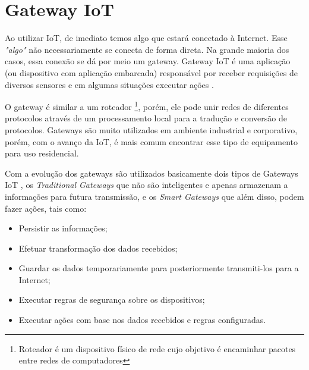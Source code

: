 \section{Gateway IoT}
\label{sec:iotGateway}

Ao utilizar IoT, de imediato temos algo que estará conectado à Internet. Esse \textit{"algo"} não necessariamente se conecta de forma direta. Na grande maioria dos casos, essa conexão se dá por meio um gateway. Gateway IoT é uma aplicação (ou dispositivo com aplicação embarcada) responsável por receber requisições de diversos sensores e em algumas situações executar ações \cite{ChenJiaLi}. 

O gateway é similar a um roteador \footnote{Roteador é um dispositivo físico de rede cujo objetivo é encaminhar pacotes entre redes de computadores}, porém, ele pode unir redes de diferentes protocolos através de um processamento local para a tradução e conversão de protocolos. Gateways são muito utilizados em ambiente industrial e corporativo, porém, com o avanço da IoT, é mais comum encontrar esse tipo de equipamento para uso residencial.

Com a evolução dos gateways são utilizados basicamente dois tipos de Gateways IoT \cite{WhatIsIotGateway}, os \textit{Traditional Gateways} que não são inteligentes e apenas armazenam a informações para futura transmissão, e os \textit{Smart Gateways} que além disso, podem fazer ações, tais como:
\begin{itemize}
	\item Persistir as informações;
	\item Efetuar transformação dos dados recebidos;
	\item Guardar os dados temporariamente para posteriormente transmiti-los para a Internet;
	\item Executar regras de segurança sobre os dispositivos;
	\item Executar ações com base nos dados recebidos e regras configuradas.
\end{itemize}

